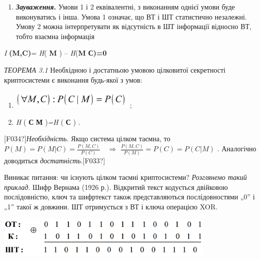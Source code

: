 \documentclass[a4paper]{article}
\newcounter{saveenum}
\newcommand\liststyleWWviiiNumxliii{%
\renewcommand\theenumi{\arabic{enumi}}
\renewcommand\theenumii{\arabic{enumii}}
\renewcommand\theenumiii{\arabic{enumiii}}
\renewcommand\theenumiv{\arabic{enumiv}}
\renewcommand\labelenumi{\theenumi.}
\renewcommand\labelenumii{\theenumii.}
\renewcommand\labelenumiii{\theenumiii.}
\renewcommand\labelenumiv{\theenumiv.}
}
\newcommand\liststyleWWviiiNumxi{%
\renewcommand\theenumi{\arabic{enumi}}
\renewcommand\theenumii{\arabic{enumii}}
\renewcommand\theenumiii{\arabic{enumiii}}
\renewcommand\theenumiv{\arabic{enumiv}}
\renewcommand\labelenumi{\theenumi.}
\renewcommand\labelenumii{\theenumii.}
\renewcommand\labelenumiii{\theenumiii.}
\renewcommand\labelenumiv{\theenumiv.}
}
\newcounter{}
\begin{document}
\liststyleWWviiiNumxliii
\setcounter{saveenum}{\value{enumi}}
\begin{enumerate}
\setcounter{enumi}{\value{saveenum}}
\item \textbf{\textit{Зауваження}}\textbf{.} Умови 1 і 2 еквівалентні, з
виконанням  однієї умови буде виконуватись і інша. Умова 1 означає, що ВТ і ШТ
статистично незалежні. Умову 2 можна інтерпретувати як відсутність в ШТ
інформації відносно ВТ, тобто взаємна інформація  
\end{enumerate}
\textit{ } \textit{I}\textit{
}\textbf{(}\textbf{M}\textbf{,}\textbf{C}\textbf{)}=\textit{ H}( \textbf{M} ) –
\textit{H}(\textbf{M} {\textbar} \textbf{С)=0}


\bigskip

\textit{ТЕОРЕМА 3.1 }Необхідною і достатньою умовою цілковитої секретності
криптосистеми є виконання будь-якої  з умов:

\liststyleWWviiiNumxi
\begin{enumerate}
\item 
\includegraphics[width=2.3146in,height=0.3346in]{crypt-img/crypt-img24.png} ;
\item \textit{ H }( \textbf{С}\textbf{ {\textbar} }\textbf{М} )\textit{=H }(
\textbf{С }) .
\end{enumerate}
\textlatin{[F034?]}\textit{Необхідність}. Якщо система цілком таємна, то 
${P(M)=P(M|C)=\frac{P(M,C)}{P(C)}}$  $ $ $ $ ${\Rightarrow}$ 
${\frac{P(M,C)}{P(M)}=P(C)=P(C|M)}$ .  Аналогічно доводиться
\textit{достатність}.\textlatin{[F033?]}


\bigskip

Виникає питання: чи існують цілком таємні криптосистеми? \textit{Розглянемо
такий приклад}. Шифр Вернама (1926 р.). Відкритий текст кодується двійковою
послідовністю, ключ та шифртекст  також представляються послідовностями  „0” і
„1” такої ж довжини. ШТ отримується з ВТ і ключа операцією XOR.


\bigskip

 \includegraphics[width=4.111in,height=0.778in]{crypt-img/crypt-img25.png} 


\bigskip
\end{document}
